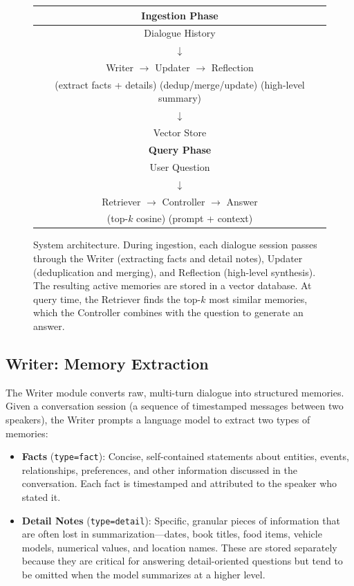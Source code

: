 \documentclass[11pt]{article}
\begin{document}
\begin{figure}[t]
\centering
{\small
\begin{tabular}{c}
\hline
\textbf{Ingestion Phase} \\
\hline
Dialogue History \\
$\downarrow$ \\
Writer $\rightarrow$ Updater $\rightarrow$ Reflection \\
(extract facts + details) \hspace{4pt} (dedup/merge/update) \hspace{4pt} (high-level summary) \\
$\downarrow$ \\
Vector Store \\
\hline
\textbf{Query Phase} \\
\hline
User Question \\
$\downarrow$ \\
Retriever $\rightarrow$ Controller $\rightarrow$ Answer \\
(top-$k$ cosine) \hspace{10pt} (prompt + context) \\
\hline
\end{tabular}
}
\caption{System architecture. During ingestion, each dialogue session passes through the Writer (extracting facts and detail notes), Updater (deduplication and merging), and Reflection (high-level synthesis). The resulting active memories are stored in a vector database. At query time, the Retriever finds the top-$k$ most similar memories, which the Controller combines with the question to generate an answer.}
\label{fig:architecture}
\end{figure}

\subsection{Writer: Memory Extraction}

The Writer module converts raw, multi-turn dialogue into structured memories. Given a conversation session (a sequence of timestamped messages between two speakers), the Writer prompts a language model to extract two types of memories:

\begin{itemize}
    \item \textbf{Facts} (\texttt{type=fact}): Concise, self-contained statements about entities, events, relationships, preferences, and other information discussed in the conversation. Each fact is timestamped and attributed to the speaker who stated it.
    \item \textbf{Detail Notes} (\texttt{type=detail}): Specific, granular pieces of information that are often lost in summarization---dates, book titles, food items, vehicle models, numerical values, and location names. These are stored separately because they are critical for answering detail-oriented questions but tend to be omitted when the model summarizes at a higher level.
\end{itemize}
\end{document}
